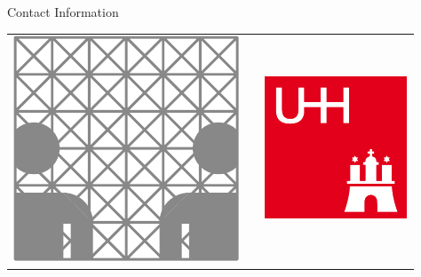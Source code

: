 \documentclass[final]{beamer}
\newlength{\onecolwid}
\newlength{\twocolwid}
\begin{document}
\begin{frame}[t]
\begin{columns}[t]
\begin{column}{\twocolwid}
\begin{columns}[t,totalwidth=\twocolwid]
\begin{column}{\onecolwid}
\begin{block}{Contact Information}

		\end{block}


		\begin{center}
		\begin{tabular}{ccc}
		\includegraphics[width=0.4\linewidth]{src/infIcon.pdf} & \hfill & \includegraphics[width=0.4\linewidth]{src/uhhIconR.pdf}
		\end{tabular}
		\end{center}
		
	\end{column}
	
\end{columns}

\end{column}


	


\end{columns}
\end{frame}
\end{document}
